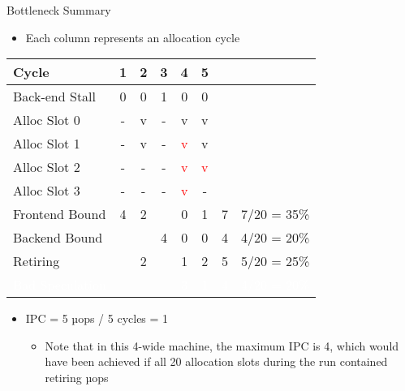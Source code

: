 \documentclass[aspectratio=169,10pt]{beamer}
\begin{document}
\begin{frame}{Bottleneck Summary}
\begin{itemize}
  \item Each column represents an allocation cycle
\end{itemize}

\begin{center}
\begin{tabular}{|l|c|c|c|c|c||c|c|}
\hline
\rowcolor{red!20} Cycle & 1 & 2 & 3 & 4 & 5 & & \\
\hline
\rowcolor{red!20} Back-end Stall & 0 & 0 & 1 & 0 & 0 & & \\
\hline
\rowcolor{greenbar!50} Alloc Slot 0 & - & v & - & v & v & & \\
\hline
\rowcolor{greenbar!50} Alloc Slot 1 & - & v & - & \textcolor{red}{v} & v & & \\
\hline
\rowcolor{greenbar!50} Alloc Slot 2 & - & - & - & \textcolor{red}{v} & \textcolor{red}{v} & & \\
\hline
\rowcolor{greenbar!50} Alloc Slot 3 & - & - & - & \textcolor{red}{v} & - & & \\
\hline
\rowcolor{frontendbound} Frontend Bound & 4 & 2 & & 0 & 1 & 7 & 7/20 = 35\% \\
\hline
\rowcolor{backendbound} Backend Bound & & & 4 & 0 & 0 & 4 & 4/20 = 20\% \\
\hline
\rowcolor{retiring} Retiring & & 2 & & 1 & 2 & 5 & 5/20 = 25\% \\
\hline
\rowcolor{badspec} \textcolor{white}{Bad Speculation} & & & & \textcolor{white}{3} & \textcolor{white}{1} & \textcolor{white}{4} & \textcolor{white}{4/20 = 20\%} \\
\hline
\end{tabular}
\end{center}

\begin{itemize}
  \item IPC = 5 µops / 5 cycles = 1
  \begin{itemize}
    \item Note that in this 4-wide machine, the maximum IPC is 4, which would have been achieved if all 20 allocation slots during the run contained retiring µops
  \end{itemize}
\end{itemize}
\end{frame}
\end{document}

